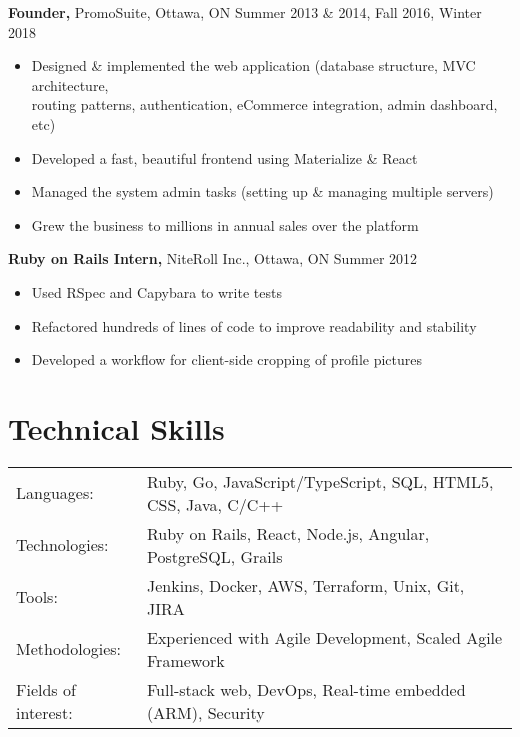 \documentclass[line, centered]{res}
\begin{document}
\begin{resume}
 {\bf Founder,} PromoSuite, Ottawa, ON \hfill Summer 2013 \& 2014, Fall 2016, Winter 2018\\[-8pt]
 \begin{itemize} \itemsep -2pt  %
    \item Designed \& implemented the web application (database structure, MVC architecture,\\
            routing patterns, authentication, eCommerce integration, admin dashboard, etc)
    \item Developed a fast, beautiful frontend using Materialize \& React
    \item Managed the system admin tasks (setting up \& managing multiple servers)
    \item Grew the business to millions in annual sales over the platform
 \end{itemize}


{\bf Ruby on Rails Intern,} NiteRoll Inc., Ottawa, ON \hfill Summer 2012\\[-8pt]
\begin{itemize} \itemsep -2pt
	\item Used RSpec and Capybara to write tests
    \item Refactored hundreds of lines of code to improve readability and stability
    \item Developed a workflow for client-side cropping of profile pictures
\end{itemize}


\section{Technical Skills}
   \begin{tabular}{l l}
    Languages: & Ruby, Go, JavaScript/TypeScript, SQL, HTML5, CSS, Java, C/C++
    \\
    Technologies: &  Ruby on Rails, React, Node.js, Angular, PostgreSQL, Grails
    \\
    Tools: & Jenkins, Docker, AWS, Terraform, Unix, Git, JIRA
    \\
    Methodologies: & Experienced with Agile Development, Scaled Agile Framework
    \\
    Fields of interest: & Full-stack web, DevOps, Real-time embedded (ARM), Security
 \end{tabular}



\end{resume}
\end{document}
